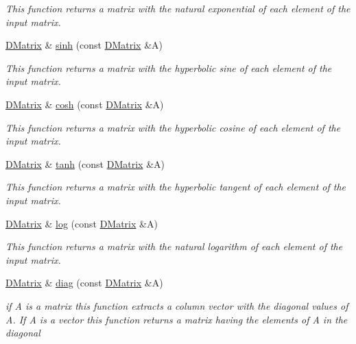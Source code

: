 \begin{DoxyCompactItemize}
\begin{DoxyCompactList}\small\item\em This function returns a matrix with the natural exponential of each element of the input matrix. \item\end{DoxyCompactList}\item 
\hyperlink{classDMatrix}{DMatrix} \& \hyperlink{classDMatrix_a6b8bfbf386b29e7333e14e4e6d894608}{sinh} (const \hyperlink{classDMatrix}{DMatrix} \&A)
\begin{DoxyCompactList}\small\item\em This function returns a matrix with the hyperbolic sine of each element of the input matrix. \item\end{DoxyCompactList}\item 
\hyperlink{classDMatrix}{DMatrix} \& \hyperlink{classDMatrix_a567d9f47845cd22715ad3d44e4644b40}{cosh} (const \hyperlink{classDMatrix}{DMatrix} \&A)
\begin{DoxyCompactList}\small\item\em This function returns a matrix with the hyperbolic cosine of each element of the input matrix. \item\end{DoxyCompactList}\item 
\hyperlink{classDMatrix}{DMatrix} \& \hyperlink{classDMatrix_a524a9c2858469d68aac6a342eac2198a}{tanh} (const \hyperlink{classDMatrix}{DMatrix} \&A)
\begin{DoxyCompactList}\small\item\em This function returns a matrix with the hyperbolic tangent of each element of the input matrix. \item\end{DoxyCompactList}\item 
\hyperlink{classDMatrix}{DMatrix} \& \hyperlink{classDMatrix_a75ca121105b6022b5cff058be162f209}{log} (const \hyperlink{classDMatrix}{DMatrix} \&A)
\begin{DoxyCompactList}\small\item\em This function returns a matrix with the natural logarithm of each element of the input matrix. \item\end{DoxyCompactList}\item 
\hyperlink{classDMatrix}{DMatrix} \& \hyperlink{classDMatrix_a417b7d2c566648bf891e5da105ba4233}{diag} (const \hyperlink{classDMatrix}{DMatrix} \&A)
\begin{DoxyCompactList}\small\item\em if A is a matrix this function extracts a column vector with the diagonal values of A. If A is a vector this function returns a matrix having the elements of A in the diagonal \item\end{DoxyCompactList}\item 

\end{DoxyCompactItemize}
